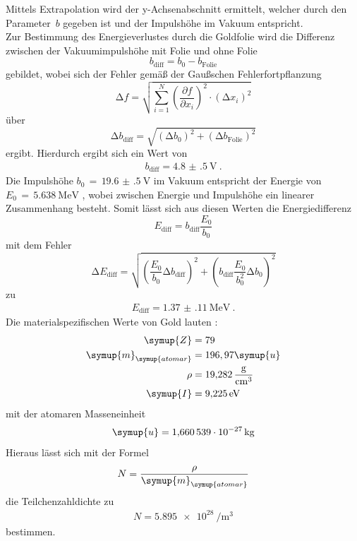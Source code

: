 Mittels Extrapolation wird der y-Achsenabschnitt ermittelt, welcher durch den Parameter~$b$
gegeben ist und der Impulshöhe im Vakuum entspricht. \\
Zur Bestimmung des Energieverlustes durch die Goldfolie wird die Differenz zwischen
der Vakuumimpulshöhe mit Folie und ohne Folie
\begin{equation}
  b_{\text{diff}} = b_0 - b_{\text{Folie}}
\end{equation}
gebildet, wobei sich der Fehler gemäß der Gaußschen Fehlerfortpflanzung
\begin{equation}
  \increment f = \sqrt{ \sum_{i=1}^N \left( \frac{\partial f}{\partial x_i}\right)^2
  \cdot (\increment x_i)^2  }
  \label{eqn:gaus}
\end{equation}
über
\begin{equation}
    \increment b_{\text{diff}} = \sqrt{(\increment b_0)^2 + (\increment b_{\text{Folie}})^2}
\end{equation}
ergibt.
Hierdurch ergibt sich ein Wert von
\begin{align*}
  b_{\text{diff}} = \SI{4.8(5)}{\volt} \: .
\end{align*}
Die Impulshöhe ${b_0\,=\,\SI{19.6(5)}{\volt}}$ im Vakuum entspricht der Energie von
${E_0\,=\,\SI{5.638}{\mega\electronvolt}}$ \cite{online3}, wobei zwischen Energie und Impulshöhe ein linearer Zusammenhang
besteht. Somit lässt sich aus diesen Werten die Energiedifferenz
\begin{equation}
  E_{\text{diff}} =   b_{\text{diff}} \frac{E_0}{b_0}
\end{equation}
mit dem Fehler
\begin{equation}
  \increment E_{\text{diff}} =\sqrt{(\frac{E_0}{b_0} \increment b_{\text{diff}})^2
  + (b_{\text{diff}} \frac{E_0}{b_0^2} \increment b_0)^2}
\end{equation}
zu
\begin{align*}
  E_{\text{diff}} = \SI{1.37(11)}{\mega\electronvolt} \: .
\end{align*}
Die materialspezifischen Werte von Gold lauten \cite{online1}:
\begin{align*}
  \symup{Z} &= 79 \\
  \symup{m}_{\symup{atomar}} &= 196,97 \symup{u} \\
  \rho &= \SI{19.282}{\g\per\cubic\centi\metre} \\
  \symup{I} &= \SI{9.225}{\electronvolt}
\end{align*}
mit der atomaren Masseneinheit \cite{online4}
\begin{align*}
  \symup{u}= \SI{1.660539e-27}{\kilo\gram}
\end{align*}
Hieraus lässt sich mit der Formel
\begin{equation}
  N=\frac{\rho}{\symup{m}_{\symup{atomar}}}
\end{equation}
die Teilchenzahldichte zu
\begin{align*}
  N=\SI{5.895e28}{\per\cubic\metre}
\end{align*}
bestimmen.

